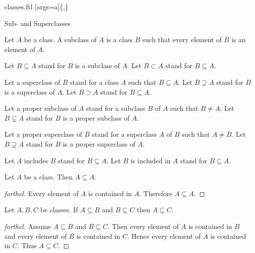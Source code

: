\documentclass{naproche-library}
\begin{document}
\begin{smodule}[title=Classes]{classes.ftl}
[args=a]{\{,\}}

\begin{sfragment}{Sub- and Superclasses}
  \begin{definition}[forthel,id=FOUNDATIONS_01_3275578358628352]
    Let $A$ be a class.
    A subclass of $A$ is a class $B$ such that every element of $B$ is an
    element of $A$.

    Let $B \subseteq A$ stand for $B$ is a subclass of $A$.
    Let $B \subset A$ stand for $B \subseteq A$.

    Let a superclass of $B$ stand for a class $A$ such that $B \subseteq A$.
    Let $B \supseteq A$ stand for $B$ is a superclass of $A$.
    Let $B \supset A$ stand for $B \subseteq A$.

    Let a proper subclass of $A$ stand for a subclass $B$ of $A$ such that $B \neq A$.
    Let $B \subsetneq A$ stand for $B$ is a proper subclass of $A$.

    Let a proper superclass of $B$ stand for a superclass $A$ of $B$ such that $A \neq B$.
    Let $B \supsetneq A$ stand for $B$ is a proper superclass of $A$.

    Let $A$ includes $B$ stand for $B \subseteq A$.
    Let $B$ is included in $A$ stand for $B \subseteq A$.
  \end{definition}

  \begin{proposition}[forthel,id=FOUNDATIONS_01_5994555614691328]
    Let $A$ be a class.
    Then $A \subseteq A$.
  \end{proposition}
  \begin{proof}[forthel]
    Every element of $A$ is contained in $A$.
    Therefore $A \subseteq A$.
  \end{proof}

  \begin{proposition}[forthel,id=FOUNDATIONS_01_3939677545431040]
    Let $A, B, C$ be classes.
    If $A \subseteq B$ and $B \subseteq C$ then $A \subseteq C$.
  \end{proposition}
  \begin{proof}[forthel]
    Assume $A \subseteq B$ and $B \subseteq C$.
    Then every element of $A$ is contained in $B$ and every element of $B$ is contained in $C$.
    Hence every element of $A$ is contained in $C$.
    Thus $A \subseteq C$.
  \end{proof}


\end{sfragment}
\end{smodule}
\end{document}
